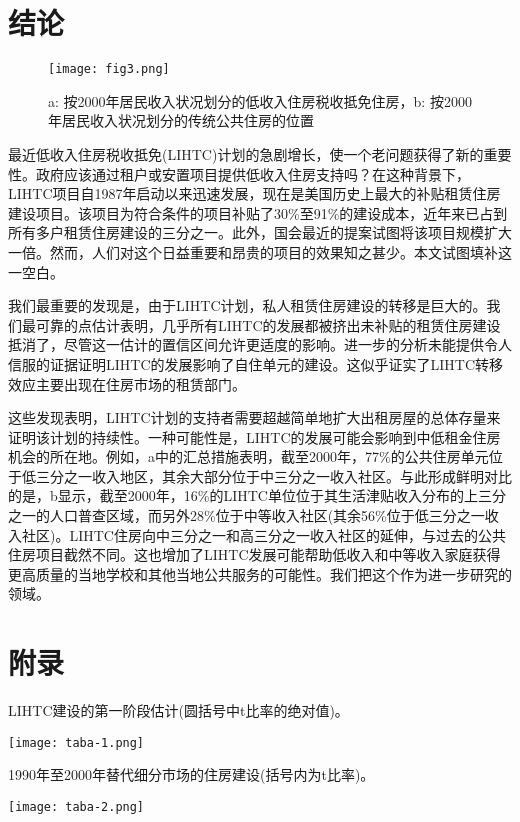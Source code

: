 \documentclass[lang=cn,11pt,a4paper]{paper}
\begin{document}
\section{结论}\label{sec6}

\begin{figure}[t]
	\centering
	\texttt{[image: fig3.png]}
  \caption{a: 按2000年居民收入状况划分的低收入住房税收抵免住房，b: 按2000年居民收入状况划分的传统公共住房的位置}\label{fig3}
\end{figure}

最近低收入住房税收抵免(LIHTC)计划的急剧增长，使一个老问题获得了新的重要性。政府应该通过租户或安置项目提供低收入住房支持吗？在这种背景下，LIHTC项目自1987年启动以来迅速发展，现在是美国历史上最大的补贴租赁住房建设项目。该项目为符合条件的项目补贴了30\%至91\%的建设成本，近年来已占到所有多户租赁住房建设的三分之一。此外，国会最近的提案试图将该项目规模扩大一倍。然而，人们对这个日益重要和昂贵的项目的效果知之甚少。本文试图填补这一空白。

我们最重要的发现是，由于LIHTC计划，私人租赁住房建设的转移是巨大的。我们最可靠的点估计表明，几乎所有LIHTC的发展都被挤出未补贴的租赁住房建设抵消了，尽管这一估计的置信区间允许更适度的影响。进一步的分析未能提供令人信服的证据证明LIHTC的发展影响了自住单元的建设。这似乎证实了LIHTC转移效应主要出现在住房市场的租赁部门。

这些发现表明，LIHTC计划的支持者需要超越简单地扩大出租房屋的总体存量来证明该计划的持续性。一种可能性是，LIHTC的发展可能会影响到中低租金住房机会的所在地。例如，a中的汇总措施表明，截至2000年，77\%的公共住房单元位于低三分之一收入地区，其余大部分位于中三分之一收入社区。与此形成鲜明对比的是，b显示，截至2000年，16\%的LIHTC单位位于其生活津贴收入分布的上三分之一的人口普查区域，而另外28\%位于中等收入社区(其余56\%位于低三分之一收入社区)。LIHTC住房向中三分之一和高三分之一收入社区的延伸，与过去的公共住房项目截然不同。这也增加了LIHTC发展可能帮助低收入和中等收入家庭获得更高质量的当地学校和其他当地公共服务的可能性。我们把这个作为进一步研究的领域。

\appendix
\setcounter{table}{0}
\renewcommand\thetable{A-\arabic{table}}
\section*{附录}

\begin{table}[h]
  \caption{LIHTC建设的第一阶段估计(圆括号中t比率的绝对值)。}\label{taba-1}
  \texttt{[image: taba-1.png]}
\noindent{}
\end{table}

\begin{table}[h]
  \caption{1990年至2000年替代细分市场的住房建设(括号内为t比率)。}\label{taba-2}
  \texttt{[image: taba-2.png]}
\end{table}


\end{document}
